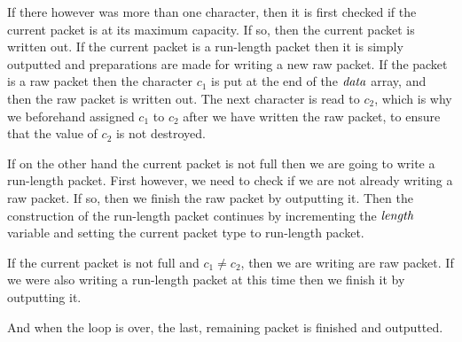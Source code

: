 If there however was more than one character, then it is first checked
if the current packet is at its maximum capacity. If so, then the
current packet is written out. If the current packet is a run-length
packet then it is simply outputted and preparations are made for
writing a new raw packet. If the packet is a raw packet then the
character $c_1$ is put at the end of the $\mathit{data}$ array, and then
the raw packet is written out. The next character is read to $c_2$,
which is why we beforehand assigned $c_1$ to $c_2$ after we have
written the raw packet, to ensure that the value of $c_2$ is not
destroyed.

If on the other hand the current packet is not full then we are going
to write a run-length packet. First however, we need to check if we
are not already writing a raw packet. If so, then we finish the raw
packet by outputting it. Then the construction of the run-length
packet continues by incrementing the $\mathit{length}$ variable and setting the
current packet type to run-length packet.

If the current packet is not full and $c_1 \neq c_2$, then we are
writing are raw packet. If we were also writing a run-length packet at
this time then we finish it by outputting it.

And when the loop is over, the last, remaining packet is finished and
outputted.

